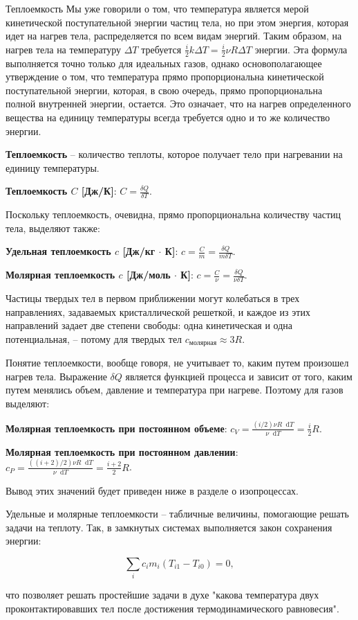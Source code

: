 \documentclass{article}
\newcommand{\definition}[2]{\begin{samepage} \textbf{#1} -- #2. \end{samepage} \par}
\newcommand{\namedequation}[2]{\begin{samepage} \textbf{#1}: $\displaystyle#2$. \end{samepage} \par}
\renewcommand{\d}{\mathop{}\!\mathrm{d}}
\begin{document}
	\begin{section}{Теплоемкость}
		Мы уже говорили о том, что температура является мерой кинетической поступательной энергии частиц тела, но при этом энергия, которая идет на нагрев тела, распределяется по всем видам энергий. Таким образом, на нагрев тела на температуру $\Delta T$ требуется $\frac{i}{2} k \Delta T = \frac{i}{2} \nu R \Delta T$ энергии. Эта формула выполняется точно только для идеальных газов, однако основополагающее утверждение о том, что температура прямо пропорциональна кинетической поступательной энергии, которая, в свою очередь, прямо пропорциональна полной внутренней энергии, остается. Это означает, что на нагрев определенного вещества на единицу температуры всегда требуется одно и то же количество энергии.

		\definition{Теплоемкость}{количество теплоты, которое получает тело при нагревании на единицу температуры}

		\namedequation{Теплоемкость $C$ [Дж/К]}{C = \frac{\delta Q}{\delta T}}

		Поскольку теплоемкость, очевидна, прямо пропорциональна количеству частиц тела, выделяют также:

		\namedequation{Удельная теплоемкость $c$ [Дж/кг $\cdot$ К]}{c = \frac{C}{m} = \frac{\delta Q}{m \delta T}}

		\namedequation{Молярная теплоемкость $c$ [Дж/моль $\cdot$ К]}{c = \frac{C}{\nu} = \frac{\delta Q}{\nu \delta T}}

		Частицы твердых тел в первом приближении могут колебаться в трех направлениях, задаваемых кристаллической решеткой, и каждое из этих направлений задает две степени свободы: одна кинетическая и одна потенциальная, -- потому для твердых тел $c_{\text{молярная}} \approx 3R$.

		Понятие теплоемкости, вообще говоря, не учитывает то, каким путем произошел нагрев тела. Выражение $\delta Q$ является функцией процесса и зависит от того, каким путем менялись объем, давление и температура при нагреве. Поэтому для газов выделяют:

		\namedequation{Молярная теплоемкость при постоянном объеме}{c_V = \frac{(i/2) \nu R \d T}{\nu \d T} = \frac{i}{2} R}

		\namedequation{Молярная теплоемкость при постоянном давлении}{c_P = \frac{((i+2)/2) \nu R \d T}{\nu \d T} = \frac{i + 2}{2} R}

		Вывод этих значений будет приведен ниже в разделе о изопроцессах.

		Удельные и молярные теплоемкости -- табличные величины, помогающие решать задачи на теплоту. Так, в замкнутых системах выполняется закон сохранения энергии:

		\begin{equation*}
			\sum_i c_i m_i (T_{i1} - T_{i0}) = 0,
		\end{equation*}

		что позволяет решать простейшие задачи в духе "какова температура двух проконтактировавших тел после достижения термодинамического равновесия".
	\end{section}
\end{document}
